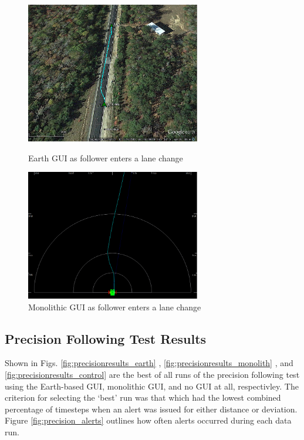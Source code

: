 \begin{figure}[ht] \centering
    \begin{minipage}[b]{0.45\linewidth} \centering 
        \includegraphics[width=3in]{./figs/lane_change.png}
        \caption{Earth GUI as follower enters a lane change} \label{fig:lanechange_earth}
    \end{minipage}
    \hspace{0.5cm}
    \begin{minipage}[b]{0.45\linewidth} \centering
        \includegraphics[width=3in]{./figs/lane_change_mono.png}
        \caption{Monolithic GUI as follower enters a lane change} \label{fig:lanechange_mono}
    \end{minipage}
\end{figure}





\subsection{Precision Following Test Results} \label{sec:precisionfollowingresults}

Shown in Figs. \ref{fig:precisionresults_earth} , \ref{fig:precisionresults_monolith} , and \ref{fig:precisionresults_control} are the best of all runs of the precision following test using the Earth-based GUI, monolithic GUI, and no GUI at all, respectivley. The criterion for selecting the `best' run was that which had the lowest combined percentage of timesteps when an alert was issued for either distance or deviation. Figure \ref{fig:precision_alerts} outlines how often alerts occurred during each data run.





